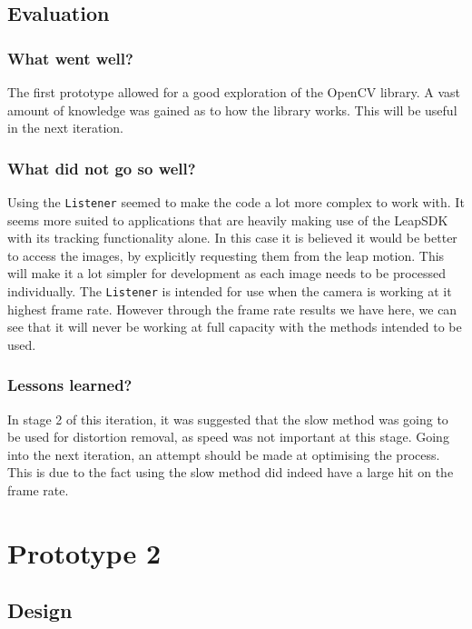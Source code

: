 \documentclass[11pt,oneside]{report}
\newcommand\code[1]{\texttt{#1}}
\begin{document}
		\subsection{Evaluation}
		\subsubsection{What went well?}
		The first prototype allowed for a good exploration of the OpenCV library.
		A vast amount of knowledge was gained as to how the library works.
		This will be useful in the next iteration.
		\subsubsection{What did not go so well?}
		Using the \code{Listener} seemed to make the code a lot more complex to work with.
		It seems more suited to applications that are heavily making use of the LeapSDK with its tracking functionality alone.
		In this case it is believed it would be better to access the images, by explicitly requesting them from the leap motion.
		This will make it a lot simpler for development as each image needs to be processed individually.
		The \code{Listener} is intended for use when the camera is working at it highest frame rate.
		However through the frame rate results we have here, we can see that it will never be working at full capacity with the methods intended to be used.
		\subsubsection{Lessons learned?}
			In stage 2 of this iteration, it was suggested that the slow method was going to be used for distortion removal, as speed was not important at this stage.
			Going into the next iteration, an attempt should be made at optimising the process.
			This is due to the fact using the slow method did indeed have a large hit on the frame rate.
	\section{Prototype 2}\label{sec:p2}
		\subsection{Design}
\end{document}
